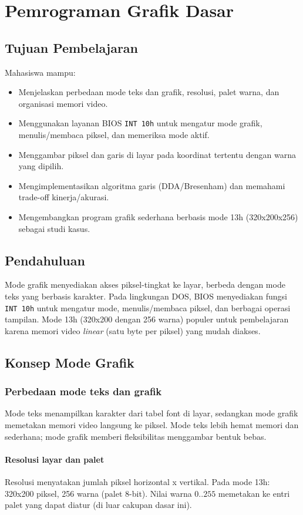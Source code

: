 \documentclass[../main.tex]{subfiles}
\begin{document}
\chapter{Pemrograman Grafik Dasar}

\section{Tujuan Pembelajaran}
Mahasiswa mampu:
\begin{itemize}
    \item Menjelaskan perbedaan mode teks dan grafik, resolusi, palet warna, dan organisasi memori video.
    \item Menggunakan layanan BIOS \texttt{INT 10h} untuk mengatur mode grafik, menulis/membaca piksel, dan memeriksa mode aktif.
    \item Menggambar piksel dan garis di layar pada koordinat tertentu dengan warna yang dipilih.
    \item Mengimplementasikan algoritma garis (DDA/Bresenham) dan memahami trade-off kinerja/akurasi.
    \item Mengembangkan program grafik sederhana berbasis mode 13h (320x200x256) sebagai studi kasus.
\end{itemize}

\section{Pendahuluan}
Mode grafik menyediakan akses piksel-tingkat ke layar, berbeda dengan mode teks yang berbasis karakter. Pada lingkungan DOS, BIOS menyediakan fungsi \texttt{INT 10h} untuk mengatur mode, menulis/membaca piksel, dan berbagai operasi tampilan. Mode 13h (320x200 dengan 256 warna) populer untuk pembelajaran karena memori video \textit{linear} (satu byte per piksel) yang mudah diakses.

\section{Konsep Mode Grafik}
\subsection{Perbedaan mode teks dan grafik}
Mode teks menampilkan karakter dari tabel font di layar, sedangkan mode grafik memetakan memori video langsung ke piksel. Mode teks lebih hemat memori dan sederhana; mode grafik memberi fleksibilitas menggambar bentuk bebas.

\subsubsection{Resolusi layar dan palet}
Resolusi menyatakan jumlah piksel horizontal x vertikal. Pada mode 13h: 320x200 piksel, 256 warna (palet 8-bit). Nilai warna \(0..255\) memetakan ke entri palet yang dapat diatur (di luar cakupan dasar ini).
\end{document}
